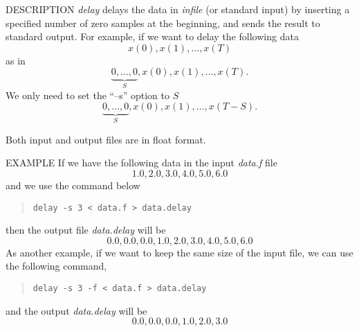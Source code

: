 \begin{synopsis}
\item [delay] [ --s $S$ ] [ --f ] [ {\em infile} ] 
\end{synopsis}

\begin{qsection}{DESCRIPTION}
{\em delay} delays the data in {\em infile} (or standard input) 
by inserting a specified number of zero samples at the beginning, 
and sends the result to standard output.
 For example, if we want to delay the following data
\begin{displaymath}
   x(0), x(1), \ldots , x(T)
\end{displaymath}
as in
\begin{displaymath}
   \underbrace{0, \dots , 0}_{S}, x(0), x(1), \dots , x(T).
\end{displaymath}
We only need to set the ``--s'' option to $S$
\begin{displaymath}
   \underbrace{0, \dots , 0}_{S}, x(0), x(1), \dots , x(T-S).
\end{displaymath}
\par
Both input and output files are in float format.
\end{qsection}

\begin{options}
\end{options}

\begin{qsection}{EXAMPLE}
If we have the following data in the input {\em data.f} file
\begin{displaymath}
 1.0, 2.0, 3.0, 4.0, 5.0, 6.0
\end{displaymath}
and we use the command below
\begin{quote}
 \verb!delay -s 3 < data.f > data.delay!
\end{quote}
then the output file {\em data.delay} will be 
\begin{displaymath}
 0.0, 0.0, 0.0, 1.0, 2.0, 3.0, 4.0, 5.0, 6.0
\end{displaymath}
As another example, if we want to keep the same size of the input file,
we can use the following command,
\begin{quote}
\verb!delay -s 3 -f < data.f > data.delay!
\end{quote}
and the output {\em data.delay} will be
\begin{displaymath}
 0.0, 0.0, 0.0, 1.0, 2.0, 3.0
\end{displaymath}
\end{qsection}

